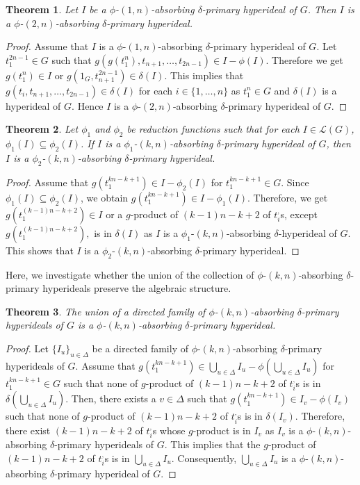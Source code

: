 \documentclass[preprint,review,10pt]{amsart}
\newtheorem{theorem}{Theorem}[section]
\theoremstyle{definition}
\theoremstyle{remark}
\numberwithin{equation}{section}
\begin{document}
\begin{theorem}
Let  $I$ be  a $\phi$-$(1,n)$-absorbing $\delta$-primary hyperideal of $G$. Then $I$ is a $\phi$-$(2,n)$-absorbing $\delta$-primary hyperideal.
\end{theorem}
\begin{proof}
Assume that $I$ is a $\phi$-$(1,n)$-absorbing $\delta$-primary hyperideal of $G$. Let $t_1^{2n-1} \in G$ such that $g(g(t_1^n),t_{n+1},\ldots,t_{2n-1}) \in I-\phi(I)$. Therefore we get  $g(t_1^n) \in I$ or $g(1_G,t_{n+1}^{2n-1}) \in \delta(I)$.  This implies that  $g(t_i,t_{n+1},\ldots,t_{2n-1}) \in  \delta(I)$ for each $i \in \{1,\ldots,n\}$
 as $t_1^n \in G$ and $\delta(I)$ is a hyperideal of $G$. Hence $I$ is a $\phi$-$(2,n)$-absorbing $\delta$-primary hyperideal of $G$.
\end{proof}
\begin{theorem}
Let $\phi_1$ and $ \phi_2$  be    reduction functions such that for each $I \in  \mathcal{L}(G)$, $\phi_1(I) \subseteq \phi_2(I)$. If $I$ is a $\phi_1$-$(k,n)$-absorbing $\delta$-primary hyperideal of $G$, then $I$ is a $\phi_2$-$(k,n)$-absorbing $\delta$-primary hyperideal.
\end{theorem}
\begin{proof}
Assume that $g(t_1^{kn-k+1}) \in I-\phi_2(I)$ for $t_1^{kn-k+1} \in G$. Since $\phi_1(I) \subseteq \phi_2(I)$, we obtain $g(t_1^{kn-k+1}) \in I-\phi_1(I)$. Therefore, we get $g(t_1^{(k-1)n-k+2}) \in I$ or a $g$-product  of $(k-1)n-k+2$ of  $t_i^,$s, except $g(t_1^{(k-1)n-k+2}),$ is in $\delta(I)$ as  $I$ is a $\phi_1$-$(k,n)$-absorbing $\delta$-hyperideal of $G$. This shows that $I$ is a $\phi_2$-$(k,n)$-absorbing $\delta$-primary hyperideal.
\end{proof}
Here, we investigate
whether the union of the collection of $\phi$-$(k,n)$-absorbing $\delta$-primary hyperideals preserve the algebraic structure.
\begin{theorem}
The union of  a directed family of $\phi$-$(k,n)$-absorbing $\delta$-primary hyperideals of $G$ is a $\phi$-$(k,n)$-absorbing $\delta$-primary hyperideal.
\end{theorem}
\begin{proof}
Let $ \{I_u\}_{u \in \Delta}$ be a directed family of $\phi$-$(k,n)$-absorbing $\delta$-primary hyperideals of $G$. Assume that $g(t_1^{kn-k+1}) \in \bigcup_{u \in \Delta}I_u-\phi(\bigcup_{u \in \Delta}I_u)$ for $t_1^{kn-k+1} \in G$ such that none of $g$-product  of $(k-1)n-k+2$ of  $t_i^,$s is in $\delta(\bigcup_{u \in \Delta}I_u)$. Then, there exists a $v \in \Delta$ such that $g(t_1^{kn-k+1}) \in I_v-\phi(I_v)$ such  that none of $g$-product  of $(k-1)n-k+2$ of  $t_i^,$s is in $\delta(I_v)$. Therefore,  there exist $(k-1)n-k+2$ of  $t_i^,$s whose $g$-product is in $ I_v$ as $I_v$ is a  $\phi$-$(k,n)$-absorbing $\delta$-primary hyperideals of $G$. This implies that the $g$-product of  $(k-1)n-k+2$ of   $t_i^,$s is in $\bigcup_{u \in \Delta}I_u$. Consequently,  $\bigcup_{u \in \Delta} I_u$ is a $\phi$-$(k,n)$-absorbing $\delta$-primary hyperideal of $G$.
\end{proof}
\end{document}
